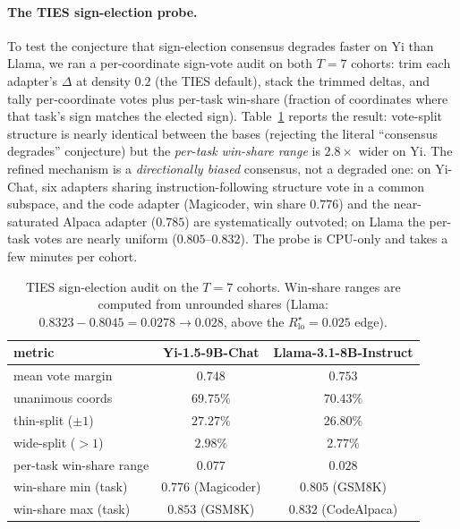 \paragraph{The TIES sign-election probe.} To test the conjecture that
sign-election consensus degrades faster on Yi than Llama, we ran a
per-coordinate sign-vote audit on both $T = 7$ cohorts: trim each
adapter's $\Delta$ at density $0.2$ (the TIES default), stack the
trimmed deltas, and tally per-coordinate votes plus per-task win-share
(fraction of coordinates where that task's sign matches the elected
sign). Table~\ref{tab:ties-probe} reports the result: vote-split
structure is nearly identical between the bases (rejecting the
literal ``consensus degrades'' conjecture) but the \emph{per-task
win-share range} is $2.8\times$ wider on Yi. The refined mechanism is
a \emph{directionally biased} consensus, not a degraded one: on
Yi-Chat, six adapters sharing instruction-following structure vote in
a common subspace, and the code adapter (Magicoder, win share $0.776$)
and the near-saturated Alpaca adapter ($0.785$) are systematically
outvoted; on Llama the per-task votes are nearly uniform
($0.805$--$0.832$). The probe is CPU-only and takes a few minutes per
cohort.

\begin{table}[h]
\centering
\caption{TIES sign-election audit on the $T = 7$ cohorts. Win-share
ranges are computed from unrounded shares (Llama:
$0.8323 - 0.8045 = 0.0278 \to 0.028$, above the
$R^\star_{\mathrm{lo}} = 0.025$ edge).}
\label{tab:ties-probe}
\begin{tabular}{lcc}
\hline
metric & Yi-1.5-9B-Chat & Llama-3.1-8B-Instruct \\
\hline
mean vote margin & $0.748$ & $0.753$ \\
unanimous coords & $69.75\%$ & $70.43\%$ \\
thin-split ($\pm 1$) & $27.27\%$ & $26.80\%$ \\
wide-split ($> 1$) & $2.98\%$ & $2.77\%$ \\
per-task win-share range & $\mathbf{0.077}$ & $\mathbf{0.028}$ \\
win-share min (task) & $0.776$ (Magicoder) & $0.805$ (GSM8K) \\
win-share max (task) & $0.853$ (GSM8K) & $0.832$ (CodeAlpaca) \\
\hline
\end{tabular}
\end{table}

